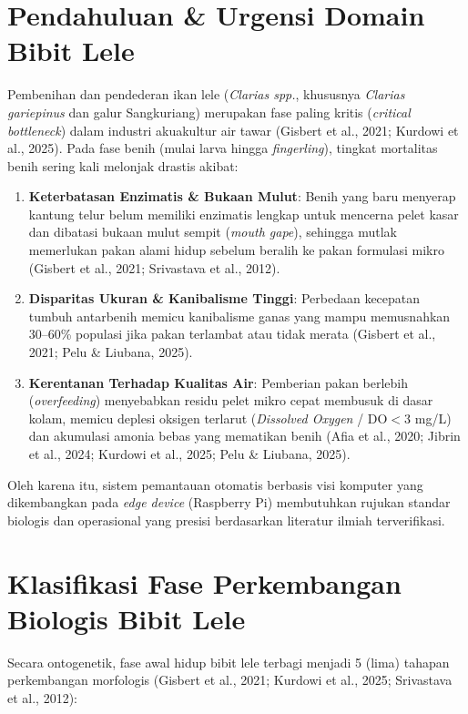 \documentclass[11pt,a4paper]{article}
\begin{document}
\section{Pendahuluan \& Urgensi Domain Bibit Lele}
Pembenihan dan pendederan ikan lele (\textit{Clarias spp.}, khususnya \textit{Clarias gariepinus} dan galur Sangkuriang) merupakan fase paling kritis (\textit{critical bottleneck}) dalam industri akuakultur air tawar (Gisbert et al., 2021; Kurdowi et al., 2025). Pada fase benih (mulai larva hingga \textit{fingerling}), tingkat mortalitas benih sering kali melonjak drastis akibat:
\begin{enumerate}[leftmargin=*,itemsep=2pt,topsep=2pt]
    \item \textbf{Keterbatasan Enzimatis \& Bukaan Mulut}: Benih yang baru menyerap kantung telur belum memiliki enzimatis lengkap untuk mencerna pelet kasar dan dibatasi bukaan mulut sempit (\textit{mouth gape}), sehingga mutlak memerlukan pakan alami hidup sebelum beralih ke pakan formulasi mikro (Gisbert et al., 2021; Srivastava et al., 2012).
    \item \textbf{Disparitas Ukuran \& Kanibalisme Tinggi}: Perbedaan kecepatan tumbuh antarbenih memicu kanibalisme ganas yang mampu memusnahkan 30--60\% populasi jika pakan terlambat atau tidak merata (Gisbert et al., 2021; Pelu \& Liubana, 2025).
    \item \textbf{Kerentanan Terhadap Kualitas Air}: Pemberian pakan berlebih (\textit{overfeeding}) menyebabkan residu pelet mikro cepat membusuk di dasar kolam, memicu deplesi oksigen terlarut (\textit{Dissolved Oxygen} / $\text{DO} < 3$ mg/L) dan akumulasi amonia bebas yang mematikan benih (Afia et al., 2020; Jibrin et al., 2024; Kurdowi et al., 2025; Pelu \& Liubana, 2025).
\end{enumerate}

Oleh karena itu, sistem pemantauan otomatis berbasis visi komputer yang dikembangkan pada \textit{edge device} (Raspberry Pi) membutuhkan rujukan standar biologis dan operasional yang presisi berdasarkan literatur ilmiah terverifikasi.

\section{Klasifikasi Fase Perkembangan Biologis Bibit Lele}
Secara ontogenetik, fase awal hidup bibit lele terbagi menjadi 5 (lima) tahapan perkembangan morfologis (Gisbert et al., 2021; Kurdowi et al., 2025; Srivastava et al., 2012):
\end{document}
